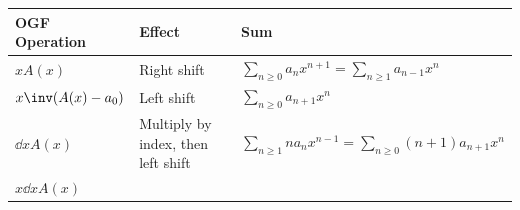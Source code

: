\begin{longtable}[]{@{}lll@{}}
\toprule
\begin{minipage}[b]{0.30\columnwidth}\raggedright
OGF Operation\strut
\end{minipage} & \begin{minipage}[b]{0.30\columnwidth}\raggedright
Effect\strut
\end{minipage} & \begin{minipage}[b]{0.30\columnwidth}\raggedright
Sum\strut
\end{minipage}\tabularnewline
\midrule
\endhead
\begin{minipage}[t]{0.30\columnwidth}\raggedright
\(xA(x)\)\strut
\end{minipage} & \begin{minipage}[t]{0.30\columnwidth}\raggedright
Right shift\strut
\end{minipage} & \begin{minipage}[t]{0.30\columnwidth}\raggedright
\(\displaystyle\sum_{n\geq 0}a_{n} x^{n+1} = \displaystyle\sum_{n\geq 1}a_{n-1} x^{n}\)\strut
\end{minipage}\tabularnewline
\begin{minipage}[t]{0.30\columnwidth}\raggedright
\(x\inv (A(x) - a_0)\)\strut
\end{minipage} & \begin{minipage}[t]{0.30\columnwidth}\raggedright
Left shift\strut
\end{minipage} & \begin{minipage}[t]{0.30\columnwidth}\raggedright
\(\displaystyle\sum_{n\geq 0}a_{n+1} x^{n}\)\strut
\end{minipage}\tabularnewline
\begin{minipage}[t]{0.30\columnwidth}\raggedright
\(\dd{}{x}A(x)\)\strut
\end{minipage} & \begin{minipage}[t]{0.30\columnwidth}\raggedright
Multiply by index, then left shift\strut
\end{minipage} & \begin{minipage}[t]{0.30\columnwidth}\raggedright
\(\displaystyle\sum_{n\geq 1}n a_n x^{n-1} = \displaystyle\sum_{n\geq 0}(n+1) a_{n+1}x^n\)\strut
\end{minipage}\tabularnewline
\begin{minipage}[t]{0.30\columnwidth}\raggedright
\(x\dd{}{x}A(x)\)\strut
\end{minipage} & \begin{minipage}[t]{0.30\columnwidth}\raggedright

\end{minipage}
\end{longtable}
